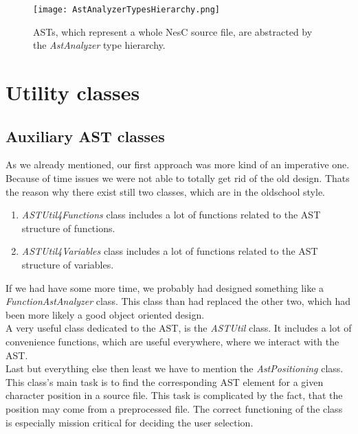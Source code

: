 \documentclass[a4paper,10pt]{report}
\begin{document}
\begin{figure}[h]
\centering
\texttt{[image: AstAnalyzerTypesHierarchy.png]}
\caption{ASTs, which represent a whole NesC source file, are abstracted by the {\it AstAnalyzer} type hierarchy.}
\label{AstAnalyzersTypeHierarchy}
\end{figure}

\section{Utility classes}

\subsection{Auxiliary AST classes}
As we already mentioned, our first approach was more kind of an imperative one.
Because of time issues we were not able to totally get rid of the old design.
Thats the reason why there exist still two classes, which are in the oldschool style.
   \begin{enumerate}
     \item {\it ASTUtil4Functions} class includes a lot of functions related to the AST structure of functions.
     \item {\it ASTUtil4Variables} class includes a lot of functions related to the AST structure of variables.
   \end{enumerate}
If we had have some more time, we probably had designed something like a {\it FunctionAstAnalyzer} class.
This class than had replaced the other two, which had been more likely a good object oriented design.\\
A very useful class dedicated to the AST, is the {\it ASTUtil} class. It includes a lot of convenience functions, which are useful everywhere,
where we interact with the AST.\\
Last but everything else then least we have to mention the {\it AstPositioning} class.
This class's main task is to find the corresponding AST element for a given character position in a source file.
This task is complicated by the fact, that the position may come from a preprocessed file.
The correct functioning of the class is especially mission critical for deciding the user selection.
\end{document}
